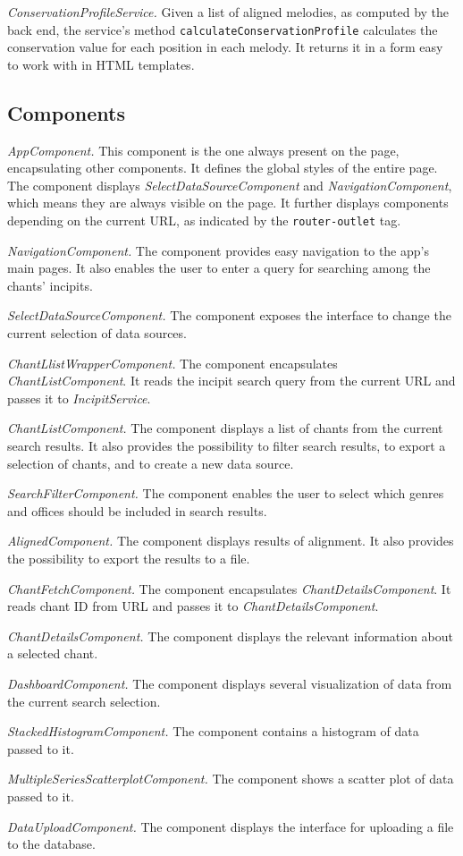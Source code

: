 \emph{ConservationProfileService.} Given a list of aligned melodies, as computed by the back end, the service's method \verb|calculateConservationProfile|
calculates the conservation value for each position in each melody. It returns it in a form easy to work with in HTML templates.

\subsection{Components}

\emph{AppComponent.} This component is the one always present on the page, encapsulating other components. It defines the global styles of the entire page.
The component displays \emph{SelectDataSourceComponent} and \emph{NavigationComponent}, which means they are always visible on the page. It further displays
components depending on the current URL, as indicated by the \verb|router-outlet| tag.

\emph{NavigationComponent.} The component provides easy navigation to the app's main pages. It also enables the user to enter a query for searching
among the chants' incipits.

\emph{SelectDataSourceComponent.} The component exposes the interface to change the current selection of data sources.

\emph{ChantLlistWrapperComponent.} The component encapsulates \emph{ChantListComponent}. It reads the incipit search query from the current URL and
passes it to \emph{IncipitService}.

\emph{ChantListComponent.} The component displays a list of chants from the current search results. It also provides the possibility to filter search
results, to export a selection of chants, and to create a new data source.

\emph{SearchFilterComponent.} The component enables the user to select which genres and offices should be included in search results.

\emph{AlignedComponent.} The component displays results of alignment. It also provides the possibility to export the results to a file.

\emph{ChantFetchComponent.} The component encapsulates \emph{ChantDetailsComponent}. It reads chant ID from URL and passes it to \emph{ChantDetailsComponent}.

\emph{ChantDetailsComponent.} The component displays the relevant information about a selected chant.

\emph{DashboardComponent.} The component displays several visualization of data from the current search selection.

\emph{StackedHistogramComponent.} The component contains a histogram of data passed to it.

\emph{MultipleSeriesScatterplotComponent.} The component shows a scatter plot of data passed to it.

\emph{DataUploadComponent.} The component displays the interface for uploading a file to the database.

